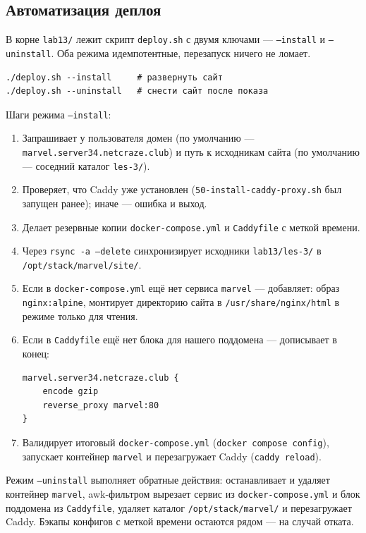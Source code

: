 \subsection{Автоматизация деплоя}

В корне \texttt{lab13/} лежит скрипт \texttt{deploy.sh} с двумя
ключами --- \texttt{--install} и \texttt{--uninstall}. Оба режима
идемпотентные, перезапуск ничего не ломает.

\begin{lstlisting}[caption={Запуск деплоя и сноса сайта},captionpos=b]
./deploy.sh --install     # развернуть сайт
./deploy.sh --uninstall   # снести сайт после показа
\end{lstlisting}

Шаги режима \texttt{--install}:

\begin{enumerate}
  \item Запрашивает у пользователя домен (по умолчанию ---
        \texttt{marvel.server34.netcraze.club}) и путь к исходникам
        сайта (по умолчанию --- соседний каталог
        \texttt{les-3/}).
  \item Проверяет, что Caddy уже установлен
        (\texttt{50-install-caddy-proxy.sh} был запущен ранее);
        иначе --- ошибка и выход.
  \item Делает резервные копии \texttt{docker-compose.yml} и
        \texttt{Caddyfile} с меткой времени.
  \item Через \texttt{rsync -a --delete} синхронизирует исходники
        \texttt{lab13/les-3/} в \texttt{/opt/stack/marvel/site/}.
  \item Если в \texttt{docker-compose.yml} ещё нет сервиса
        \texttt{marvel} --- добавляет: образ \texttt{nginx:alpine},
        монтирует директорию сайта в \texttt{/usr/share/nginx/html}
        в режиме только для чтения.
  \item Если в \texttt{Caddyfile} ещё нет блока для нашего поддомена
        --- дописывает в конец:
        \begin{lstlisting}
marvel.server34.netcraze.club {
    encode gzip
    reverse_proxy marvel:80
}
        \end{lstlisting}
  \item Валидирует итоговый \texttt{docker-compose.yml}
        (\texttt{docker compose config}), запускает контейнер
        \texttt{marvel} и перезагружает Caddy
        (\texttt{caddy reload}).
\end{enumerate}

Режим \texttt{--uninstall} выполняет обратные действия: останавливает
и удаляет контейнер \texttt{marvel}, awk-фильтром вырезает сервис из
\texttt{docker-compose.yml} и блок поддомена из \texttt{Caddyfile},
удаляет каталог \texttt{/opt/stack/marvel/} и перезагружает Caddy.
Бэкапы конфигов с меткой времени остаются рядом --- на случай отката.

